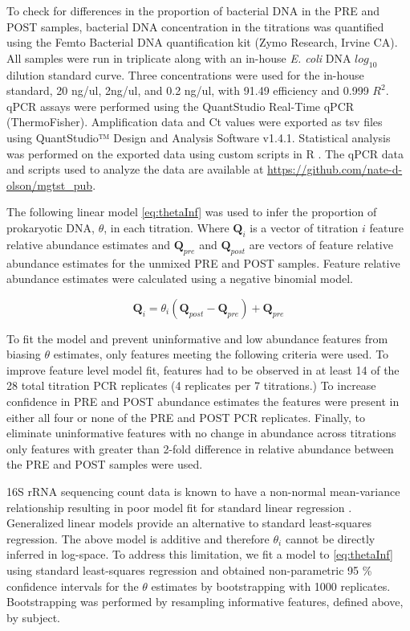 \documentclass[12pt]{article}
\begin{document}
To check for differences in the proportion of bacterial DNA in the PRE
and POST samples, bacterial DNA concentration in the titrations was quantified
using the Femto Bacterial DNA quantification kit (Zymo Research, Irvine
CA). All samples were run in triplicate along with an in-house \emph{E.
coli} DNA \(log_{10}\) dilution standard curve. Three concentrations were used
for the in-house standard, 20 ng/ul, 2ng/ul, and 0.2 ng/ul,
with 91.49 efficiency and 0.999 \(R^2\). qPCR assays were
performed using the QuantStudio Real-Time qPCR (ThermoFisher).
Amplification data and Ct values were exported as tsv files using
QuantStudio™ Design and Analysis Software v1.4.1. Statistical analysis
was performed on the exported data using custom scripts in R \cite{R}.
The qPCR data and scripts used to analyze the data are available at
\url{https://github.com/nate-d-olson/mgtst_pub}.


The following linear model \eqref{eq:thetaInf} was used to infer the
proportion of prokaryotic DNA, \(\theta\), in each titration. Where
\(\textbf{Q}_{i}\) is a vector of titration \(i\) feature relative
abundance estimates and \(\textbf{Q}_{pre}\) and \(\textbf{Q}_{post}\)
are vectors of feature relative abundance estimates for the unmixed PRE
and POST samples. Feature relative abundance estimates were calculated
using a negative binomial model.

\begin{equation}
  \textbf{Q}_{i} = \theta_i (\textbf{Q}_{post} -\textbf{Q}_{pre}) + \textbf{Q}_{pre}
  \label{eq:thetaInf}
\end{equation}

To fit the model and prevent uninformative and low abundance features
from biasing \(\theta\) estimates, only features meeting the following
criteria were used. To improve feature level model fit, features had to be observed in at least 14 of the 28 total titration PCR replicates (4 replicates per 7 titrations.)
To increase confidence in PRE and POST abundance estimates the features were present in either all four or none of the PRE and POST PCR replicates.
Finally, to eliminate uninformative features with no change in abundance across titrations only features with greater than 2-fold difference in relative abundance between the PRE and POST samples were used.

16S rRNA sequencing count data is known to have a non-normal
mean-variance relationship resulting in poor model fit for standard
linear regression \cite{McMurdie2014}. Generalized linear models
provide an alternative to standard least-squares regression. The above
model is additive and therefore \(\theta_i\) cannot be directly inferred
in log-space. To address this limitation, we fit a model to \eqref{eq:thetaInf}
using standard least-squares regression and obtained non-parametric 95 \%
confidence intervals for the \(\theta\) estimates by bootstrapping with 1000
replicates. Bootstrapping was performed by resampling informative features, defined above, by subject.
\end{document}
